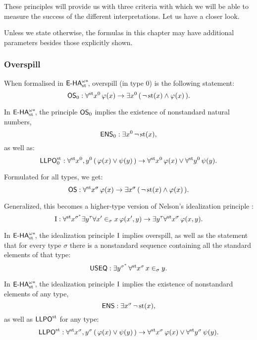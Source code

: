 These principles will provide us with three criteria with which we will be able to measure the success of the different interpretations. Let us have a closer look. 

\begin{remark}
Unless we state otherwise, the formulas in this chapter may have additional parameters besides those explicitly shown. 
\end{remark}


\subsubsection*{Overspill}

When formalised in ${\textsf{\upshape E-HA}}^{\omega*}_{\operatorname{st}{}}\!$, overspill (in type 0) is the following statement:
\[ \textsf{\upshape OS}_0: \forall^{\operatorname{st}{}}\! x^0 \, \varphi(x) \to \exists x^0 \, ( \, \lnot \operatorname{st}(x) \land \varphi(x) \, ). \]

\begin{prop} {\rm \cite{palmgren98}}
In ${\textsf{\upshape E-HA}}^{\omega*}_{\operatorname{st}{}}\!$, the principle $\textsf{\upshape OS}_0$ implies the existence of nonstandard natural numbers,
\[ \textsf{\upshape ENS}_0: \exists x^0 \, \lnot \operatorname{st}(x), \]
as well as:
\[ \textsf{\upshape LLPO}^{\operatorname{st}}_0: \forall^{\operatorname{st}{}}\! x^0, y^0 \, ( \, \varphi(x) \lor \psi(y) \, ) \to \forall^{\operatorname{st}{}}\! x^0 \, \varphi(x) \lor \forall^{\operatorname{st}{}}\! y^0 \, \psi(y) . \]
\end{prop}

Formulated for all types, we get:
\[ \textsf{\upshape OS}: \forall^{\operatorname{st}{}}\! x^\sigma \, \varphi(x) \to \exists x^\sigma \, ( \, \lnot \operatorname{st}(x) \land \varphi(x) \, ). \]

Generalized, this becomes a higher-type version of Nelson's idealization principle \cite{nelson77}:
\[ \operatorname{I}: \forall^{\operatorname{st}{}}\! x^{\sigma^*} \exists y^\tau \forall x' \in_{\sigma} x \, \varphi(x', y) \to \exists y^\tau \forall^{\operatorname{st}{}}\! x^\sigma \, \varphi(x, y). \]

\begin{prop} {\rm \cite{palmgren98}} In ${\textsf{\upshape E-HA}}^{\omega*}_{\operatorname{st}{}}\!$, the idealization principle $\operatorname{I}$ implies overspill, as well as the statement that for every type $\sigma$ there is a nonstandard sequence containing all the standard elements of that type:
\[ \textsf{\upshape USEQ}: \exists y^{\sigma^*} \, \forall^{\operatorname{st}{}}\! x^\sigma \, x \in_{\sigma} y. \]
\end{prop}

\begin{prop}\label{prop:LLPO} In ${\textsf{\upshape E-HA}}^{\omega*}_{\operatorname{st}{}}\!$, the idealization principle $\operatorname{I}$ implies the existence of nonstandard elements of any type,
\[ \textsf{\upshape ENS}: \exists x^\sigma \, \lnot \operatorname{st}(x), \]
as well as $\textsf{\upshape LLPO}^{\operatorname{st}}$ for any type:
\[ \textsf{\upshape LLPO}^{\operatorname{st}}: \forall^{\operatorname{st}{}}\! x^\sigma, y^\sigma \, ( \, \varphi(x) \lor \psi(y) \, ) \to \forall^{\operatorname{st}{}}\! x^\sigma \, \varphi(x) \lor \forall^{\operatorname{st}{}}\! y^\sigma \, \psi(y) . \]
\end{prop}

